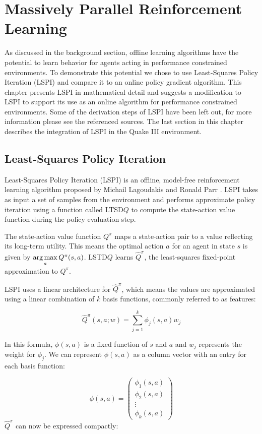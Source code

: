 \chapter{Massively Parallel Reinforcement Learning}
\label{chap:implementation}

As discussed in the background section, offline learning algorithms have the potential to learn behavior for agents acting in performance constrained environments. To demonstrate this potential we chose to use Least-Squares Policy Iteration (LSPI) and compare it to an online policy gradient algorithm. This chapter presents LSPI in mathematical detail and suggests a modification to LSPI to support its use as an online algorithm for performance constrained environments. Some of the derivation steps of LSPI have been left out, for more information please see the referenced sources. The last section in this chapter describes the integration of LSPI in the Quake III environment.

\section{Least-Squares Policy Iteration}
\label{chap:implementation:lspi}

Least-Squares Policy Iteration (LSPI) is an offline, model-free reinforcement learning algorithm proposed by Michail Lagoudakis and Ronald Parr \cite{lspi}. LSPI takes as input a set of samples from the environment and performs approximate policy iteration using a function called LTSD$Q$ to compute the state-action value function during the policy evaluation step.

The state-action value function $Q^\pi$ maps a state-action pair to a value reflecting its long-term utility. This means the optimal action $a$ for an agent in state $s$ is given by $\operatorname*{arg\,max}\limits_a Q^\pi(s,a)$. LSTD$Q$ learns $\hat{Q}^\pi$, the least-squares fixed-point approximation to $Q^\pi$.

LSPI uses a linear architecture for $\hat{Q}^\pi$, which means the values are approximated using a linear combination of $k$ basis functions, commonly referred to as features:

\[
    \hat{Q}^\pi(s,a;w) = \sum_{j=1}^k \phi_j(s,a)w_j
\]

In this formula, $\phi(s,a)$ is a fixed function of $s$ and $a$ and $w_j$ represents the weight for $\phi_j$. We can represent $\phi(s,a)$ as a column vector with an entry for each basis function:

\[
    \phi(s,a) = \begin{pmatrix}
       \phi_1(s,a) \\ \phi_2(s,a) \\ \vdots \\ \phi_k(s,a)
    \end{pmatrix}
\]
$\hat{Q}^\pi$  can now be expressed compactly:

